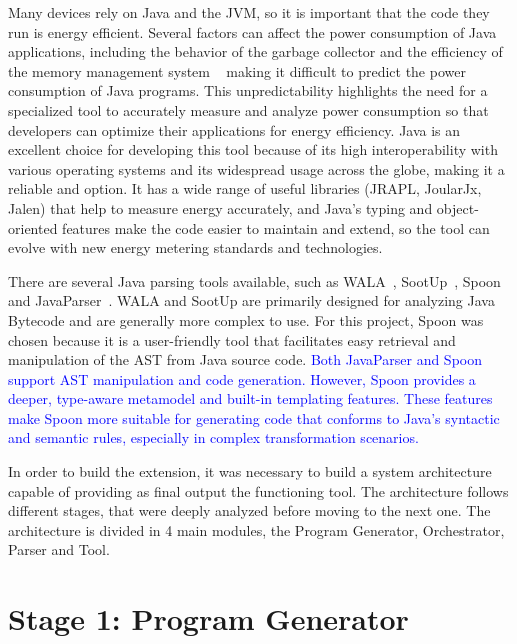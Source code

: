 Many devices rely on Java and the JVM, so it is important that the code they run is energy efficient. Several factors can affect the power consumption of Java applications, including the behavior of the garbage collector and the efficiency of the memory management system ~\cite{10.5555/1267847.1267870} making it difficult to predict the power consumption of Java programs. This unpredictability highlights the need for a specialized tool to accurately measure and analyze power consumption so that developers can optimize their applications for energy efficiency.
Java is an excellent choice for developing this tool because of its high interoperability with various operating systems and its widespread usage across the globe, making it a reliable and option. It has a wide range of useful libraries (JRAPL, JoularJx, Jalen) that help to measure energy accurately, and Java's typing and object-oriented features make the code easier to maintain and extend, so the tool can evolve with new energy metering standards and technologies. 

There are several Java parsing tools available, such as WALA~\cite{wala_main}, SootUp~\cite{sootup_main}, Spoon~\cite{spoon_main} and JavaParser~\cite{javaParser}. WALA and SootUp are primarily designed for analyzing Java Bytecode and are generally more complex to use. For this project, Spoon was chosen because it is a user-friendly tool that facilitates easy retrieval and manipulation of the AST from Java source code. \textcolor{blue}{Both JavaParser and Spoon support AST manipulation and code generation. However, Spoon provides a deeper, type-aware metamodel and built-in templating features. These features make Spoon more suitable for generating code that conforms to Java’s syntactic and semantic rules, especially in complex transformation scenarios.} 

In order to build the extension, it was necessary to build a system architecture capable of providing as final output the functioning tool. The architecture follows different stages, that were deeply analyzed before moving to the next one.
The architecture is divided in 4 main modules, the Program Generator, Orchestrator, Parser and Tool.


\section{Stage 1: Program Generator} \label{sec:work_stage1_program_generator}

